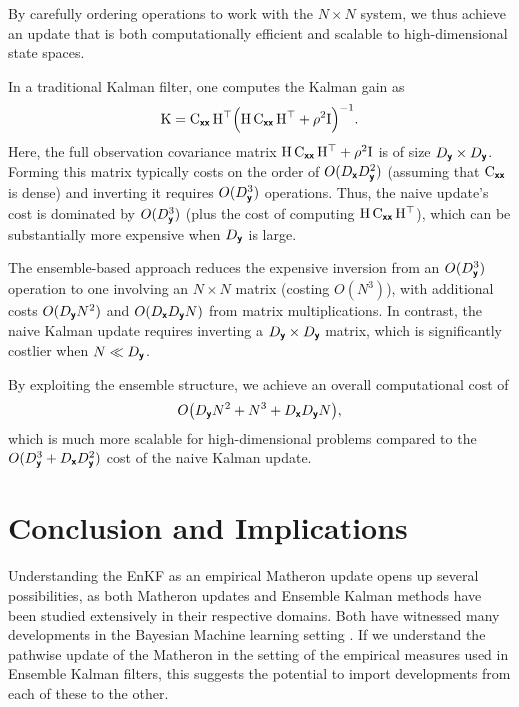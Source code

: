 \documentclass[wcp]{jmlr} %
\begin{document}
By carefully ordering operations to work with the \(N\times N\) system, we thus achieve an update that is both computationally efficient and scalable to high-dimensional state spaces.

In a traditional Kalman filter, one computes the Kalman gain as
\[
\mathrm{K} = \mathrm{C}_{\boldsymbol{\mathsf{xx}}}\,\mathrm{H}^\top \Bigl(\mathrm{H}\,\mathrm{C}_{\boldsymbol{\mathsf{xx}}}\,\mathrm{H}^\top + \rho^2\mathrm{I}\Bigr)^{-1}.
\]
Here, the full observation covariance matrix \(\mathrm{H}\,\mathrm{C}_{\boldsymbol{\mathsf{xx}}}\,\mathrm{H}^\top + \rho^2\mathrm{I}\) is of size \(D_{\boldsymbol{\mathsf{y}}}\times D_{\boldsymbol{\mathsf{y}}}\). Forming this matrix typically costs on the order of \(O(D_{\boldsymbol{\mathsf{x}}}D_{\boldsymbol{\mathsf{y}}}^2)\) (assuming that \(\mathrm{C}_{\boldsymbol{\mathsf{xx}}}\) is dense) and inverting it requires \(O(D_{\boldsymbol{\mathsf{y}}}^3)\) operations. Thus, the naive update's cost is dominated by \(O(D_{\boldsymbol{\mathsf{y}}}^3)\) (plus the cost of computing \(\mathrm{H}\,\mathrm{C}_{\boldsymbol{\mathsf{xx}}}\,\mathrm{H}^\top\)), which can be substantially more expensive when \(D_{\boldsymbol{\mathsf{y}}}\) is large.

The ensemble-based approach reduces the expensive inversion from an \(O(D_{\boldsymbol{\mathsf{y}}}^3)\) operation to one involving an \(N\times N\) matrix (costing \(O(N^3)\)), with additional costs \(O(D_{\boldsymbol{\mathsf{y}}}N^2)\) and \(O(D_{\boldsymbol{\mathsf{x}}}D_{\boldsymbol{\mathsf{y}}}N)\) from matrix multiplications. In contrast, the naive Kalman update requires inverting a \(D_{\boldsymbol{\mathsf{y}}}\times D_{\boldsymbol{\mathsf{y}}}\) matrix, which is significantly costlier when \(N \ll D_{\boldsymbol{\mathsf{y}}}\).

By exploiting the ensemble structure, we achieve an overall computational cost of
\[
    O\bigl(D_{\boldsymbol{\mathsf{y}}}N^2 + N^3 + D_{\boldsymbol{\mathsf{x}}}D_{\boldsymbol{\mathsf{y}}}N\bigr),
\]
which is much more scalable for high-dimensional problems compared to the \(O(D_{\boldsymbol{\mathsf{y}}}^3 + D_{\boldsymbol{\mathsf{x}}}D_{\boldsymbol{\mathsf{y}}}^2)\) cost of the naive Kalman update.

\section{Conclusion and Implications}

Understanding the EnKF as an empirical Matheron update opens up several possibilities, as both Matheron updates and Ensemble Kalman methods have been studied extensively in their respective domains.
Both have witnessed many developments in the Bayesian Machine learning setting
\citep{Alzraiee2022Scalable,Chada2022Convergence,Chen2021Autodifferentiable,Chen2023Reducedorder,Dunbar2022Ensemble,Guth2020Ensemble,Huang2022Iterated,Kovachki2019Ensemble,MacKinlay2025Gaussian,Oliver2022Hybrid,Schillings2017Analysis,Schneider2022Ensemble,Spantini2022Coupling}.
If we understand the pathwise update of the Matheron in the setting of the empirical measures used in Ensemble Kalman filters, this suggests the potential to import developments from each of these to the other.
\end{document}
